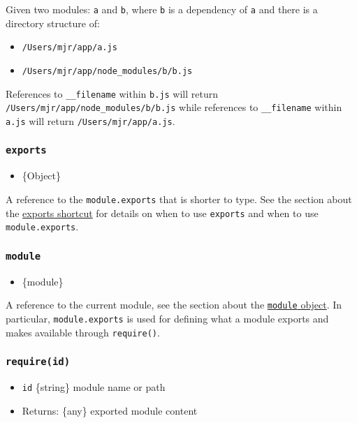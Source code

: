 Given two modules: \texttt{a} and \texttt{b}, where \texttt{b} is a
dependency of \texttt{a} and there is a directory structure of:

\begin{itemize}
\tightlist
\item
  \texttt{/Users/mjr/app/a.js}
\item
  \texttt{/Users/mjr/app/node\_modules/b/b.js}
\end{itemize}

References to \texttt{\_\_filename} within \texttt{b.js} will return
\texttt{/Users/mjr/app/node\_modules/b/b.js} while references to
\texttt{\_\_filename} within \texttt{a.js} will return
\texttt{/Users/mjr/app/a.js}.

\subsubsection{\texorpdfstring{\texttt{exports}}{exports}}\label{exports}

\begin{itemize}
\tightlist
\item
  \{Object\}
\end{itemize}

A reference to the \texttt{module.exports} that is shorter to type. See
the section about the \hyperref[exports-shortcut]{exports shortcut} for
details on when to use \texttt{exports} and when to use
\texttt{module.exports}.

\subsubsection{\texorpdfstring{\texttt{module}}{module}}\label{module}

\begin{itemize}
\tightlist
\item
  \{module\}
\end{itemize}

A reference to the current module, see the section about the
\hyperref[the-module-object]{\texttt{module} object}. In particular,
\texttt{module.exports} is used for defining what a module exports and
makes available through \texttt{require()}.

\subsubsection{\texorpdfstring{\texttt{require(id)}}{require(id)}}\label{requireid}

\begin{itemize}
\tightlist
\item
  \texttt{id} \{string\} module name or path
\item
  Returns: \{any\} exported module content
\end{itemize}

